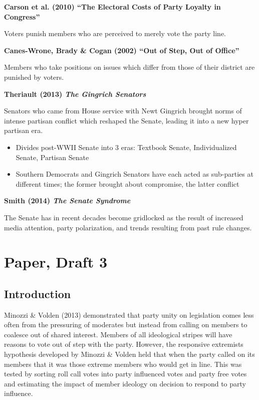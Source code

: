 \documentclass[12pt]{article}
\begin{document}
\noindent
\textbf{Carson et al. (2010) ``The Electoral Costs of Party Loyalty in Congress''}

Voters punish members who are perceived to merely vote the party line.

\noindent
\textbf{Canes-Wrone, Brady \& Cogan (2002) ``Out of Step, Out of Office''}

Members who take positions on issues which differ from those of their district are punished by voters.

\noindent
\textbf{Theriault (2013) \textit{The Gingrich Senators}}

Senators who came from House service with Newt Gingrich brought norms of intense partisan conflict which reshaped the Senate, leading it into a new hyper partisan era.

\begin{itemize}
	\item Divides post-WWII Senate into 3 eras: Textbook Senate, Individualized Senate, Partisan Senate
		
	\item Southern Democrats and Gingrich Senators have each acted as sub-parties at different times; the former brought about compromise, the latter conflict
\end{itemize}

\noindent
\textbf{Smith (2014) \textit{The Senate Syndrome}}

The Senate has in recent decades become gridlocked as the result of increased media attention, party polarization, and trends resulting from past rule changes. 



\pagebreak



\section{Paper, Draft 3}

\subsection{Introduction}

Minozzi \& Volden (2013) demonstrated that party unity on legislation comes less often from the pressuring of moderates but instead from calling on members to coalesce out of shared interest. Members of all ideological stripes will have reasons to vote out of step with the party. However, the responsive extremists hypothesis developed by Minozzi \& Volden held that when the party called on its members that it was those extreme members who would get in line. This was tested by sorting roll call votes into party influenced votes and party free votes and estimating the impact of member ideology on decision to respond to party influence.
\end{document}
